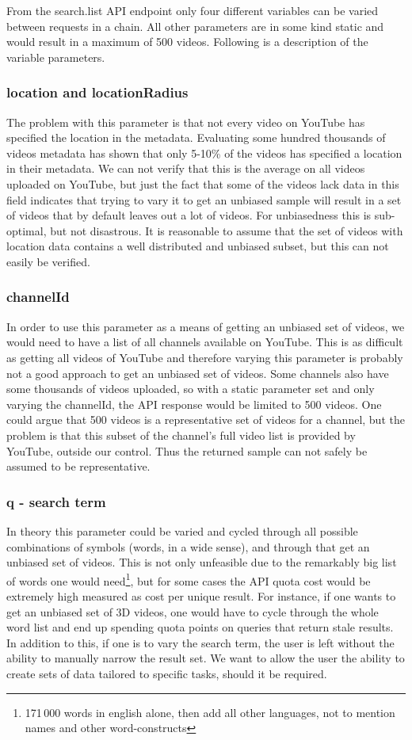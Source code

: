 From the search.list API endpoint only four different variables can be varied 
between requests in a chain. All other parameters are in some kind static and
would result in a maximum of 500 videos. Following is a description of the
variable parameters.

\subsubsection{location and locationRadius}
The problem with this parameter is that not every video on YouTube has specified
the location in the metadata. Evaluating some hundred thousands of videos
metadata has shown that only 5-10\% of the videos has specified a location in
their metadata. We can not verify that this is the average on all videos
uploaded on YouTube, but just the fact that some of the videos lack data in
this field indicates that trying to vary it to get an unbiased sample will
result in a set of videos that by default leaves out a lot of videos. For
unbiasedness this is sub-optimal, but not disastrous. It is reasonable to
assume that the set of videos with location data contains a well distributed
and unbiased subset, but this can not easily be verified.

\subsubsection{channelId}
In order to use this parameter as a means of getting an unbiased set of videos,
we would need to have a list of all channels available on YouTube. This is as
difficult as getting all videos of YouTube and therefore varying this parameter 
is probably not a good approach to get an unbiased set of videos. Some channels
also have some thousands of videos uploaded, so with a static parameter set and
only varying the channelId, the API response would be limited to 500 videos. One
could argue that 500 videos is a representative set of videos for a channel, but
the problem is that this subset of the channel's full video list is provided by
YouTube, outside our control. Thus the returned sample can not safely be assumed
to be representative.

\subsubsection{q - search term}
In theory this parameter could be varied and cycled through all possible
combinations of symbols (words, in a wide sense), and through that get an
unbiased set of videos. This is not only unfeasible due to the remarkably big
list of words one would need\footnote{171\,000 words in english alone, then add
all other languages, not to mention names and other word-constructs}, but for
some cases the API quota cost would be extremely high measured as cost per unique
result. For instance, if one wants to get an unbiased set of 3D videos, one would
have to cycle through the whole word list and end up spending quota points on queries
that return stale results. In addition to this, if one is to vary the
search term, the user is left without the ability to manually narrow the result
set. We want to allow the user the ability to create sets of data tailored to
specific tasks, should it be required.

